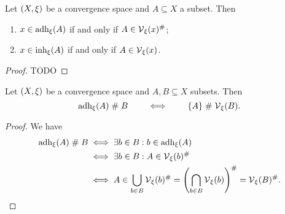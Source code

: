 \begin{proposition} \label{principalAdherenceInherence}
Let $\left( X,\xi \right)$ be a convergence space and $A\subseteq X$ a subset. Then
\begin{enumerate}
\item $x\in \operatorname{adh}_\xi(A)$ \textup{if and only if} $A\in \operatorname{\mathcal{V}}_\xi(x)^{\mathrel{\#}}$;
\item $x\in \operatorname{inh}_\xi(A)$ \textup{if and only if} $A\in \operatorname{\mathcal{V}}_\xi(x)$.
\end{enumerate}
\end{proposition}
\begin{proof}
TODO
\end{proof}
\begin{corollary} \label{setAdherenceInherence}
Let $\left( X,\xi \right)$ be a convergence space and $A,B\subseteq X$ subsets. Then
\[ \operatorname{adh}_\xi(A) \mathrel{\#} B \qquad\iff\qquad \{A\} \mathrel{\#} \operatorname{\mathcal{V}}_\xi(B). \]
\end{corollary}
\begin{proof}
We have
\begin{align*}
\operatorname{adh}_\xi(A) \mathrel{\#} B &\iff \exists b\in B: b\in \operatorname{adh}_\xi(A) \\
&\iff \exists b\in B: A\in \operatorname{\mathcal{V}}_\xi(b)^{\mathrel{\#}} \\
&\iff A \in \bigcup_{b\in B}\operatorname{\mathcal{V}}_\xi(b)^{\mathrel{\#}} = \left(\bigcap_{b\in B}\operatorname{\mathcal{V}}_\xi(b)\right)^{\mathrel{\#}} = \operatorname{\mathcal{V}}_\xi(B)^{\mathrel{\#}}.
\end{align*}
\end{proof}

